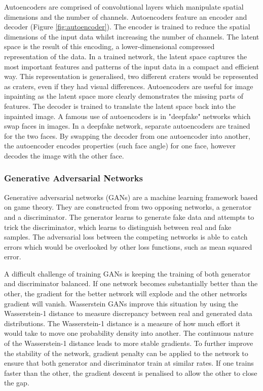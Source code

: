 \documentclass[twocolumn]{article}
\begin{document}
Autoencoders are comprised of convolutional layers which manipulate spatial dimensions and the number of channels.
Autoencoders feature an encoder and decoder (Figure \ref{fig:autoencoder}).
The encoder is trained to reduce the spatial dimensions of the input data whilst increasing the number of channels.
The latent space is the result of this encoding, a lower-dimensional compressed representation of the data.
In a trained network, the latent space captures the most important features and patterns of the input data in a compact and efficient way\autocite{michelucciIntroductionAutoencoders2022}.
This representation is generalised, two different craters would be represented as craters, even if they had visual differences.
Autoencoders are useful for image inpainting as the latent space more clearly demonstrates the missing parts of features.
The decoder is trained to translate the latent space back into the inpainted image.
A famous use of autoencoders is in "deepfake" networks which swap faces in images.
In a deepfake network, separate autoencoders are trained for the two faces.
By swapping the decoder from one autoencoder into another, the autoencoder encodes properties (such face angle) for one face, however decodes the image with the other face.


\subsubsection{Generative Adversarial Networks}
\label{sec:org908a3c0}
Generative adversarial networks (GANs)\autocite{goodfellowGenerativeAdversarialNetworks2020} are a machine learning framework based on game theory.
They are constructed from two opposing networks, a generator and a discriminator.
The generator learns to generate fake data and attempts to trick the discriminator, which learns to distinguish between real and fake samples.
The adversarial loss between the competing networks is able to catch errors which would be overlooked by other loss functions, such as mean squared error\autocite{lotterUnsupervisedLearningVisual2016}.

A difficult challenge of training GANs is keeping the training of both generator and discriminator balanced.
If one network becomes substantially better than the other, the gradient for the better network will explode and the other networks gradient will vanish.
Wasserstein GANs\autocite{arjovskyWassersteinGenerativeAdversarial2017} improve this situation by using the Wasserstein-1 distance to measure discrepancy between real and generated data distributions.
The Wasserstein-1 distance is a measure of how much effort it would take to move one probability density into another.
The continuous nature of the Wasserstein-1 distance leads to more stable gradients.
To further improve the stability of the network, gradient penalty can be applied to the network to ensure that both generator and discriminator train at similar rates.
If one trains faster than the other, the gradient descent is penalised to allow the other to close the gap.
\end{document}
